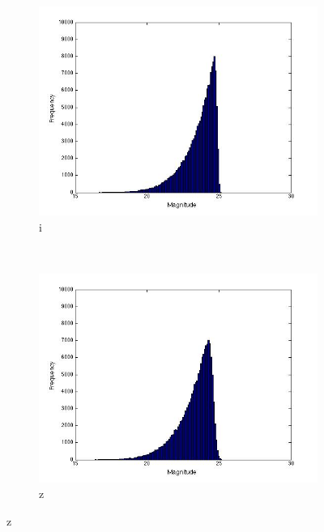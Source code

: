 \documentclass[useAMS,usenatbib,fleqn]{mn2e}
\begin{document}
\begin{figure}
\begin{subfigure}[b]{0.2\textwidth}
                \includegraphics[trim = 35px 15px 50px 25px, clip=true,width=\textwidth]{figures/i.jpg}
                \caption{i}
        \end{subfigure}
         ~
        \begin{subfigure}[b]{0.2\textwidth}
                \includegraphics[trim = 35px 15px 50px 25px, clip=true,width=\textwidth]{figures/z.jpg}
                \caption{z}
        \end{subfigure}
        

\end{figure}
\end{document}
